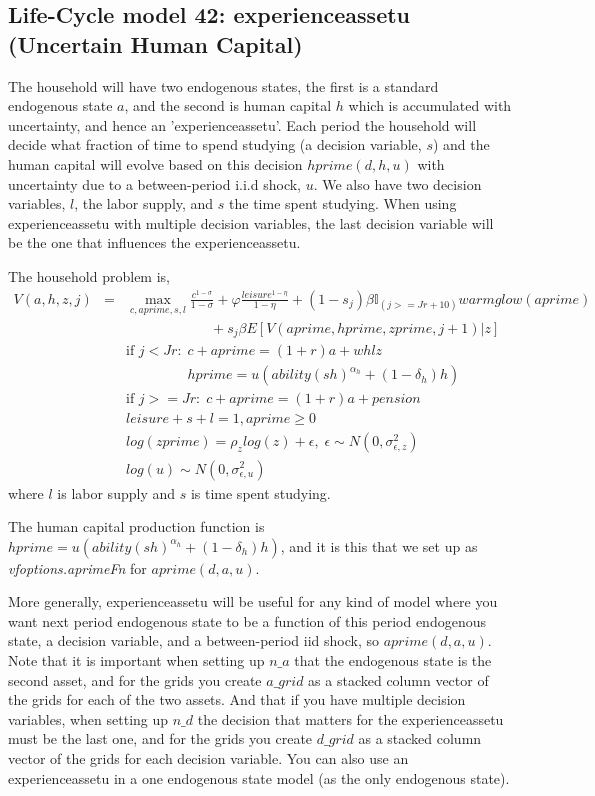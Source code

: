 \subsection{Life-Cycle model 42: experienceassetu (Uncertain Human Capital)}
The household will have two endogenous states, the first is a standard endogenous state $a$, and the second is human capital $h$ which is accumulated with uncertainty, and hence an 'experienceassetu'. Each period the household will decide what fraction of time to spend studying (a decision variable, $s$) and the human capital will evolve based on this decision $hprime(d,h,u)$ with uncertainty due to a between-period i.i.d shock, $u$. We also have two decision variables, $l$, the labor supply, and $s$ the time spent studying. When using experienceassetu with multiple decision variables, the last decision variable will be the one that influences the experienceassetu.

The household problem is,
\begin{eqnarray*}
 V(a,h,z,j) &=& \max_{c,aprime,s,l} \frac{c^{1-\sigma}}{1-\sigma} + \varphi \frac{leisure^{1-\eta}}{1-\eta} + (1-s_j)\beta  \mathbb{I}_{(j>=Jr+10)} warmglow(aprime)    \\
 && \quad \quad \quad \quad \quad \quad  + s_j \beta E[V(aprime,hprime,zprime,j+1)|z] \\
&& \text{if }j<Jr: \; c+aprime=(1+r)a+ w h l z \\
&& \phantom{\text{if }j<Jr:} \; hprime=u (ability (s h)^{\alpha_h} + (1-\delta_h) h) \\
&& \text{if }j>=Jr: \; c+aprime=(1+r)a +pension \\
&& leisure+s+l=1, aprime\geq 0 \\
&& log(zprime)=\rho_z log(z) + \epsilon, \; \epsilon \sim N(0,\sigma_{\epsilon,z}^2) \\
&& log(u) \sim N(0,\sigma_{\epsilon,u}^2)
\end{eqnarray*}
where $l$ is labor supply and $s$ is time spent studying.

The human capital production function is $hprime=u (ability (s h)^{\alpha_h} + (1-\delta_h) h)$, and it is this that we set up as \textit{vfoptions.aprimeFn} for $aprime(d,a,u)$.

More generally, experienceassetu will be useful for any kind of model where you want next period endogenous state to be a function of this period endogenous state, a decision variable, and a between-period iid shock, so $aprime(d,a,u)$. Note that it is important when setting up $n\_{}a$ that the endogenous state is the second asset, and for the grids you create $a\_{}grid$ as a stacked column vector of the grids for each of the two assets. And that if you have multiple decision variables, when setting up $n\_{}d$ the decision that matters for the experienceassetu must be the last one, and for the grids you create $d\_{}grid$ as a stacked column vector of the grids for each decision variable. You can also use an experienceassetu in a one endogenous state model (as the only endogenous state).


